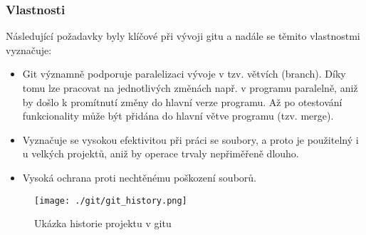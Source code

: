 \documentclass[main.tex]{subfiles}
\begin{document}


\subsubsection{Vlastnosti}
Následující požadavky byly klíčové při vývoji gitu a nadále se těmito vlastnostmi vyznačuje:
\begin{itemize}
\item Git významně podporuje paralelizaci vývoje v tzv. větvích (branch). Díky tomu lze pracovat na jednotlivých změnách např. v programu paralelně, aniž by došlo k promítnutí změny do hlavní verze programu. Až po otestování funkcionality může být přidána do hlavní větve programu (tzv. merge). 

\item Vyznačuje se vysokou efektivitou při práci se soubory, a proto je použitelný i u velkých projektů, aniž by operace trvaly nepřiměřeně dlouho.

\item Vysoká ochrana proti nechtěnému poškození souborů.

\end{itemize}


		\begin{figure}[h]
			\centering
			\texttt{[image: ./git/git\_history.png]}
			\caption{Ukázka historie projektu v gitu}
		\end{figure}


\end{document}
